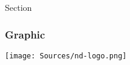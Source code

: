 \documentclass[11pt]{beamer}
\begin{document}
\begin{section}{Section}
\begin{frame}
\frametitle{Graphic}
\texttt{[image: Sources/nd-logo.png]}
\end{frame}
\end{section}
\end{document}
